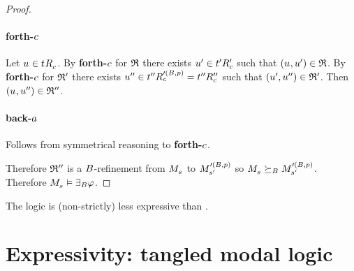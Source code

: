 \begin{proof}
\paragraph{forth-$\agentC$}
Let $\kStateU \in \kSuccessorsC{\kStateT}$.
By {\bf forth-$\agentC$} for $\bisimulation$ there exists $\kStateUP \in \kSuccessorsPC{\kStateTP}$ such that $(\kStateU, \kStateUP) \in \bisimulation$.
By {\bf forth-$\agentC$} for $\refinement'$ there exists $\kStateUPP \in \kSuccessorsC[\prime(\agentsB, \atomP)]{\kStateTPP} = \kSuccessorsPPC{\kStateTPP}$ such that $(\kStateUP, \kStateUPP) \in \refinement'$.
Then $(\kStateU, \kStateUPP) \in \refinement''$.

\paragraph{back-$\agentA$}
Follows from symmetrical reasoning to {\bf forth-$\agentC$}.

Therefore $\refinement''$ is a $\agentsB$-refinement from $\kPModel{\kStateS}$ to $\kPModel[\prime(\agentsB, \atomP)]{\kStateSP}$ so $\kPModel{\kStateS} \simulatesBs \kPModel[\prime(\agentsB, \atomP)]{\kStateSP}$.
Therefore $\kPModel{\kStateS} \entails \somerefsBs \phi$.
\end{proof}

\begin{corollary}
The logic \logicRmlKF{} is (non-strictly) less expressive than \logicBqmlKF{}.
\end{corollary}

\section{Expressivity: tangled modal logic}\label{rml-k4-tangle}

